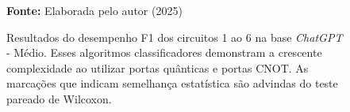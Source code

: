 \begin{figure}
\caption{Resultados do desempenho F1 dos circuitos 1 ao 6 na base \textit{ChatGPT} - Médio. Esses algoritmos classificadores demonstram a crescente complexidade ao utilizar portas quânticas e portas CNOT. As marcações que indicam semelhança estatística são advindas do teste pareado de Wilcoxon.}
\label{fig:f1:medium:g1}
     \centering
    \centering

      \par\medskip\ABNTEXfontereduzida\selectfont\textbf{Fonte:} Elaborada pelo autor (2025) \par\medskip
\end{figure}